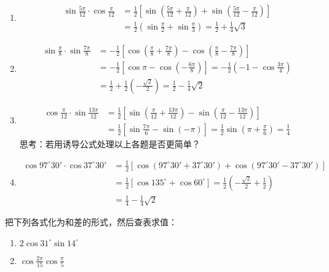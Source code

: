 \begin{solution}
\begin{enumerate}[(1)]
    \item \[\begin{split}
        \sin\frac{5\pi}{12}\cdot \cos \frac{\pi}{12} &=\frac{1}{2}\left[\sin\left(\frac{5\pi}{12}+\frac{\pi}{12}\right)+\sin\left(\frac{5\pi}{12}-\frac{\pi}{12}\right)\right]\\
        &=\frac{1}{2}\left(\sin\frac{\pi}{2}+\sin\frac{\pi}{3}\right)=\frac{1}{2}+\frac{1}{4}\sqrt{3}
    \end{split}\]
    \item \[\begin{split}
        \sin\frac{\pi}{8}\cdot \sin\frac{7\pi}{8}&=-\frac{1}{2}\left[\cos\left(\frac{\pi}{8}+\frac{7\pi}{8}\right)-\cos\left(\frac{\pi}{8}-\frac{7\pi}{8}\right)\right]  \\
        &=-\frac{1}{2}\left[\cos\pi-\cos\left(-\frac{6\pi}{8}\right)\right]=-\frac{1}{2}\left(-1-\cos\frac{3\pi}{4}\right)\\
        &=\frac{1}{2}+\frac{1}{2}\left(-\frac{\sqrt{2}}{2}\right)=\frac{1}{2}-\frac{1}{4}\sqrt{2}
    \end{split}\]
    \item \[\begin{split}
        \cos\frac{\pi}{12}\cdot \sin\frac{13\pi}{12}&=\frac{1}{2}\left[\sin\left(\frac{\pi}{12}+\frac{13\pi}{12}\right)-\sin\left(\frac{\pi}{12}-\frac{13\pi}{12}\right)\right]       \\
        &=\frac{1}{2}\left[\sin\frac{7\pi}{6}-\sin(-\pi)\right] = \frac{1}{2}\sin\left(\pi+\frac{\pi}{6}\right)=\frac{1}{4}
    \end{split}\]
思考：若用诱导公式处理以上各题是否更简单？
    \item \[\begin{split}
        \cos97^{\circ}30'\cdot \cos 37^{\circ}30'&=\frac{1}{2}\left[\cos(97^{\circ}30'+37^{\circ}30')+\cos(97^{\circ}30'-37^{\circ}30')\right]\\
&=\frac{1}{2}\left[\cos135^{\circ}+\cos60^{\circ}\right]=\frac{1}{2}\left(-\frac{\sqrt{2}}{2}+\frac{1}{2}\right)\\
&=\frac{1}{4}-\frac{1}{4}\sqrt{2}
    \end{split}\]
\end{enumerate}
\end{solution}

\begin{example}
    把下列各式化为和差的形式，然后查表求值：
\begin{multicols}{2}
\begin{enumerate}[(1)]
    \item $2\cos 31^{\circ}\sin14^{\circ}$
    \item $\cos\frac{2\pi}{15}\cos\frac{\pi}{5}$
\end{enumerate}
\end{multicols}
\end{example}

